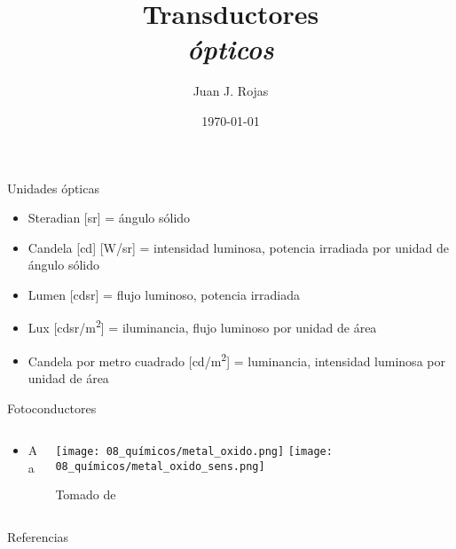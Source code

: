 \documentclass[aspectratio=169]{beamer}
\title{Transductores \\ \emph{ópticos}}
\author{
    Juan J. Rojas
}
\institute{Instituto Tecnológico de Costa Rica}
\date{\today}
\begin{document}

\maketitle



\newcommand{\blackandwhite}{white} %

\begin{frame}[t]{Unidades ópticas}
    \begin{itemize}
        \item Steradian [sr] = ángulo sólido 
        \item Candela [cd] [W/sr] = intensidad luminosa, potencia irradiada por unidad de ángulo sólido
        \item Lumen [cd\cdot sr] = flujo luminoso, potencia irradiada
        \item Lux [cd\cdot sr/m\textsuperscript{2}] = iluminancia, flujo luminoso por unidad de área
        \item Candela por metro cuadrado [cd/m\textsuperscript{2}] = luminancia, intensidad luminosa por unidad de área
    \end{itemize}
\end{frame}

\begin{frame}{Fotoconductores}
    \begin{columns}[T, onlytextwidth]
        \begin{column}{0.55\textwidth}
            \begin{itemize}
                \item Aa
            \end{itemize}
        \end{column}
        \begin{column}{0.45\textwidth}
        \centering
        \texttt{[image: 08\_químicos/metal\_oxido.png]}
        \vspace*{1cm}
        \texttt{[image: 08\_químicos/metal\_oxido\_sens.png]}

        \tiny{Tomado de \cite{ida2013sensors}}
        \end{column}
    \end{columns}
\end{frame}

\begin{frame}{Referencias}
\footnotesize
\printbibliography[heading=none]
\end{frame}
\end{document}
